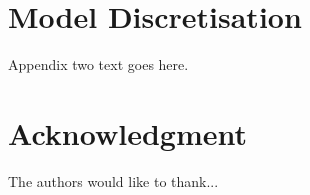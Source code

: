 \documentclass[journal]{IEEEtran}
\begin{document}
\section{Model Discretisation} \label{app:model_discretisation}
Appendix two text goes here.


\section*{Acknowledgment}


The authors would like to thank...


\ifCLASSOPTIONcaptionsoff
  \newpage
\fi





%
%
%



%
\end{document}
